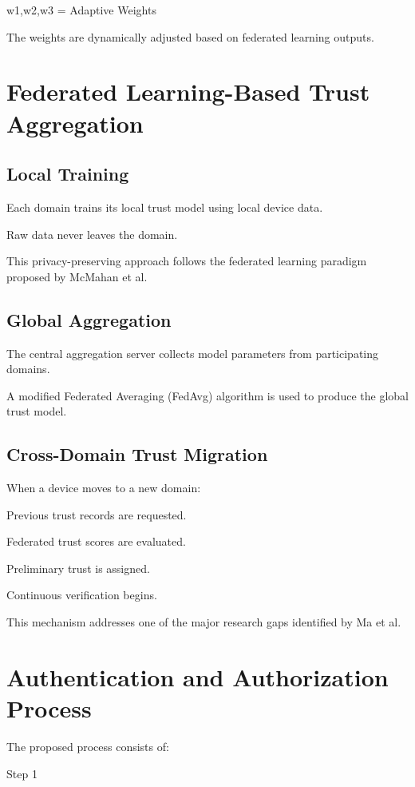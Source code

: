 w1,w2,w3 = Adaptive Weights


The weights are dynamically adjusted based on federated learning outputs.


\section{Federated Learning-Based Trust Aggregation}

\subsection{Local Training}

Each domain trains its local trust model using local device data.


Raw data never leaves the domain.


This privacy-preserving approach follows the federated learning paradigm proposed by McMahan et al.


\subsection{Global Aggregation}

The central aggregation server collects model parameters from participating domains.


A modified Federated Averaging (FedAvg) algorithm is used to produce the global trust model.


\subsection{Cross-Domain Trust Migration}

When a device moves to a new domain:


Previous trust records are requested.


Federated trust scores are evaluated.


Preliminary trust is assigned.


Continuous verification begins.


This mechanism addresses one of the major research gaps identified by Ma et al.


\section{Authentication and Authorization Process}

The proposed process consists of:


Step 1


